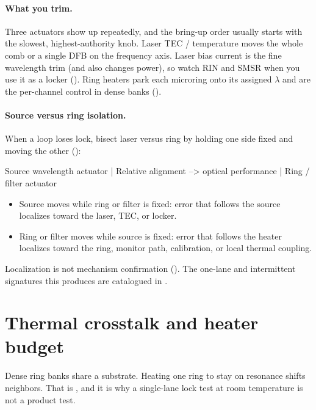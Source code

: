\paragraph{What you trim.}
Three actuators show up repeatedly, and the bring-up order usually starts with the
slowest, highest-authority knob. Laser TEC / temperature moves the whole comb or
a single DFB on the frequency axis. Laser bias current is the fine wavelength trim
(and also changes power), so watch RIN and SMSR when you use it as a locker
(). Ring heaters park each microring onto its assigned
$\lambda$ and are the per-channel control in dense banks
().

\paragraph{Source versus ring isolation.}
When a loop loses lock, bisect laser versus ring by holding one side fixed and
moving the other ():

\begin{dectree}
Source wavelength actuator
  |
Relative alignment --> optical performance
  |
Ring / filter actuator
\end{dectree}

\begin{itemize}
\item Source moves while ring or filter is fixed: error that follows the source
      localizes toward the laser, TEC, or locker.
\item Ring or filter moves while source is fixed: error that follows the heater
      localizes toward the ring, monitor path, calibration, or local thermal
      coupling.
\end{itemize}
Localization is not mechanism confirmation (). The
one-lane and intermittent signatures this produces are catalogued in
.

\section{Thermal crosstalk and heater budget}
\label{sec:thermal-xtalk}

Dense ring banks share a substrate. Heating one ring to stay on resonance shifts
neighbors. That is , and it is why a single-lane lock
test at room temperature is not a product test.

